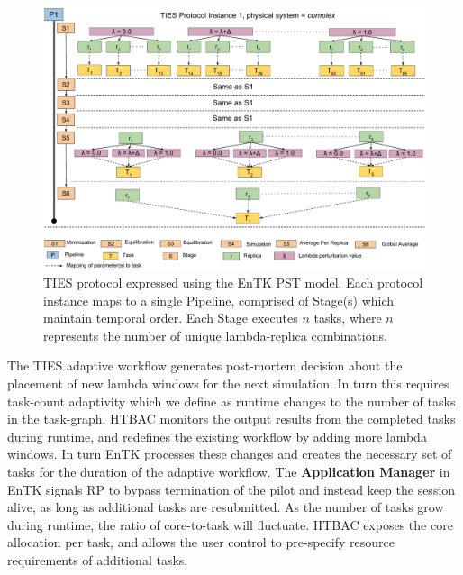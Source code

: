 \begin{figure}
  \centering
   \includegraphics[width=\columnwidth]{figures/_TIES_EnTK_implementation.pdf}
  \caption{TIES protocol expressed using the EnTK PST model. Each protocol 
  instance maps to a single Pipeline, comprised of Stage(s) which maintain 
  temporal order. Each Stage executes $n$ tasks, where $n$ represents the 
  number of unique lambda-replica combinations.}
\label{fig:pst}
\end{figure}

The TIES adaptive workflow generates post-mortem decision about the placement
of new lambda windows for the next simulation. In turn this requires task-count 
adaptivity which we define as runtime changes to the
number of tasks in the task-graph. HTBAC monitors the output results from the 
completed tasks during runtime, and redefines the existing workflow by adding
more lambda windows. In turn EnTK processes these changes and creates the necessary
set of tasks for the duration of the adaptive workflow. The \textbf{Application
Manager} in EnTK signals RP to bypass termination of the pilot and instead keep the
session alive, as long as additional tasks are resubmitted. 
As the number of tasks grow during runtime, the ratio of core-to-task will fluctuate. 
HTBAC exposes the core allocation per task, 
and allows the user control to pre-specify resource requirements of additional tasks.




